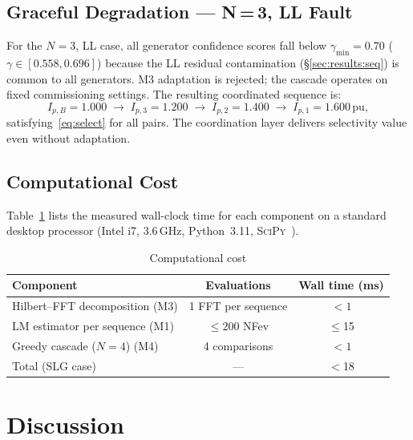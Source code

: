 \documentclass[journal,twoside,10pt]{IEEEtran}
\newcommand{\pu}{\,\text{pu}}
\begin{document}
\subsection{Graceful Degradation — N\,=\,3, LL Fault}
\label{sec:results:degrade}

For the $N=3$, LL case, all generator confidence scores fall below
$\gamma_{\min} = 0.70$ ($\gamma \in [0.558, 0.696]$) because the LL
residual contamination (§\ref{sec:results:seq}) is common to all generators.
M3 adaptation is rejected; the cascade operates on fixed commissioning
settings.  The resulting coordinated sequence is:
\begin{equation}
  I_{p,B} = 1.000 \;\to\; I_{p,3} = 1.200 \;\to\;
  I_{p,2} = 1.400 \;\to\; I_{p,1} = 1.600 \pu,
\end{equation}
satisfying~\eqref{eq:select} for all pairs.
The coordination layer delivers selectivity value even without adaptation.

\subsection{Computational Cost}
\label{sec:results:compute}

Table~\ref{tab:compute} lists the measured wall-clock time for each
component on a standard desktop processor (Intel i7, 3.6\,GHz, Python~3.11,
\textsc{SciPy}~\cite{Virtanen2020}).

\begin{table}[!t]
  \renewcommand{\arraystretch}{1.2}
  \caption{Computational cost}
  \label{tab:compute}
  \centering
  \begin{tabular}{lcc}
    \toprule
    Component & Evaluations & Wall time (ms) \\
    \midrule
    Hilbert--FFT decomposition (M3) & 1 FFT per sequence & $<1$ \\
    LM estimator per sequence (M1)  & $\leq$200 NFev & $\leq$15 \\
    Greedy cascade ($N=4$) (M4)     & 4 comparisons & $<1$ \\
    \midrule
    Total (SLG case)                & ---           & $<$18 \\
    \bottomrule
  \end{tabular}
\end{table}

\section{Discussion}
\label{sec:disc}
\end{document}
